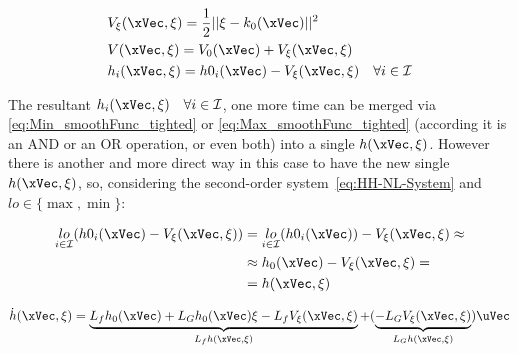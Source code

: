 \begin{subequations}
    \label{eq:Backstepp_CF_multipleCBF}
    \begin{align}
        &V_{\mathbf{\xi}}(\xVec, \mathbf{\xi}) = \frac{1}{2}|| \mathbf{\xi} -  k_0(\xVec) ||^2 
        \label{eq:Backstepp_prejudice_multipleCBF}\\
        &V(\xVec, \mathbf{\xi}) = V_0(\xVec) + V_{\mathbf{\xi}}(\xVec, \mathbf{\xi}) 
        \label{eq:Backstepp_V_multipleCBF}\\
        &h_i(\xVec, \mathbf{\xi}) = h0_i(\xVec) - V_{\mathbf{\xi}}(\xVec, \mathbf{\xi}) \quad \forall i \in \mathcal{I}
        \label{eq:Backstepp_h_multipleCBF}
    \end{align}
\end{subequations}

The resultant  \(h_i(\xVec, \mathbf{\xi}) \quad \forall i \in \mathcal{I}\), one more time can be merged via \ref{eq:Min_smoothFunc_tighted} or \ref{eq:Max_smoothFunc_tighted} (according it is an AND or an OR operation, or even both) into a single  \(h(\xVec, \mathbf{\xi})\). However there is another and more direct way in this case to have the new single  \(h(\xVec, \mathbf{\xi})\), so, considering the second-order system~\ref{eq:HH-NL-System} and \(lo \in \{\max, \min\}\):

\begin{align}
        \underset{ i \in \mathcal{I}}{lo}(h0_i(\xVec) - V_{\mathbf{\xi}}(\xVec, \mathbf{\xi})) &= \underset{ i \in \mathcal{I}}{lo}(h0_i(\xVec)) - V_{\mathbf{\xi}}(\xVec, \mathbf{\xi}) \approx 
                                                                                                \notag\\
                                                                                               &\approx h_0(\xVec) - V_{\mathbf{\xi}}(\xVec, \mathbf{\xi}) = 
                                                                                               \notag\\
                                                                                               &=h(\xVec, \mathbf{\xi})
                                                                                               \label{eq:Backstepp_h_multipleCBF2}
\end{align}

\begin{equation}
        \dot{h}(\xVec, \mathbf{\xi}) = \underbrace{L_fh_0(\xVec) + L_Gh_0(\xVec)\mathbf{\xi} - L_fV_{\mathbf{\xi}}(\xVec, \mathbf{\xi})}_{L_fh(\xVec, \mathbf{\xi})} + (\underbrace{- L_GV_{\mathbf{\xi}}(\xVec, \mathbf{\xi})}_{L_Gh(\xVec, \mathbf{\xi})}) \uVec
        \label{eq:Backstepp_h_multipleCBF_derivatives2}
\end{equation}


